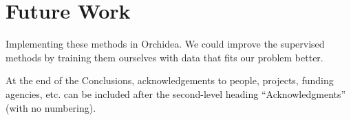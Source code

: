 \documentclass{article}
\begin{document}
	\section{Future Work}\label{sec:futurework}
	Implementing these methods in Orchidea. We could improve the supervised methods by training them ourselves with data that fits our problem better.
	
	\begin{acknowledgments}
		At the end of the Conclusions, acknowledgements to people, projects, funding agencies, etc. can be included after the second-level heading  ``Acknowledgments'' (with no numbering).
	\end{acknowledgments} 
	
	
	
\end{document}
